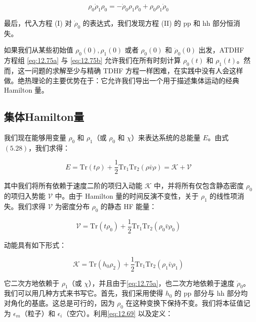 \begin{equation}
\rho_{0}\dot{\rho}_{1}\rho_{0}=-\dot{\rho}_{0}\rho_{1}\rho_{0}+\rho_{0}\rho_{1}\dot{\rho}_{0}\label{eq:12.78}
\end{equation}

最后，代入方程 (I) 对 $\dot{\rho}_{0}$ 的表达式，我们发现方程 (II) 的 pp 和 hh 部分恒消失。

如果我们从某些初始值 $\rho_{0}(0),\rho_{1}(0)$ 或者 $\rho_{0}(0)$ 和 $\dot{\rho}_{0}(0)$
出发，ATDHF 方程组 \ref{eq:12.75a} 与 \ref{eq:12.75b} 允许我们在所有时刻计算 $\rho_{0}(t)$
和 $\rho_{1}(t)$。然而，这一问题的求解至少与精确 TDHF 方程一样困难，在实践中没有人会这样做。绝热理论的主要优势在于：它允许我们导出一个用于描述集体运动的经典
Hamilton 量。

\subsection{集体Hamilton量\label{subsec:12.3.2}}

我们现在能够用变量 $\rho_{0}$ 和 $\rho_{1}$（或 $\rho_{0}$ 和 $\chi$）来表达系统的总能量
$E$。由式 $(5.28)$，我们求得：

\begin{equation}
E=\mathrm{Tr}(t\rho)+\frac{1}{2}\mathrm{Tr}_{1}\mathrm{Tr}_{2}(\rho\bar{v}\rho)=\mathcal{K}+\mathcal{V}\label{eq:12.79}
\end{equation}

其中我们将所有依赖于速度二阶的项归入动能 $\mathcal{K}$ 中，并将所有仅包含静态密度 $\rho_{0}$ 的项归入势能
$\mathcal{V}$ 中。由于 Hamilton 量的时间反演不变性，关于 $\rho_{1}$ 的线性项消失。我们求得
$\mathcal{V}$ 为密度分布 $\rho_{0}$ 的静态 HF 能量：

\begin{equation}
\mathcal{V}=\mathrm{Tr}(t\rho_{0})+\frac{1}{2}\mathrm{Tr}_{1}\mathrm{Tr}_{2}(\rho_{0}\bar{v}\rho_{0})\label{eq:12.80}
\end{equation}

动能具有如下形式：

\begin{equation}
\mathcal{K}=\mathrm{Tr}(h_{0}\rho_{2})+\frac{1}{2}\mathrm{Tr}_{1}\mathrm{Tr}_{2}(\rho_{1}\bar{v}\rho_{1})\label{eq:12.81}
\end{equation}

它二次方地依赖于 $\rho_{1}$（或 $\chi$），并且由于\ref{eq:12.75a}，也二次方地依赖于速度 $\dot{\rho}_{0}$。我们可以用几种方式来书写它。首先，我们采用使得
$h_{0}$ 的 pp 部分与 hh 部分均对角化的基底。这总是可行的，因为 $\rho_{0}$ 在这种变换下保持不变。我们将本征值记为
$\epsilon_{m}$（粒子）和 $\epsilon_{i}$（空穴）。利用\ref{eq:12.69} 以及定义：

